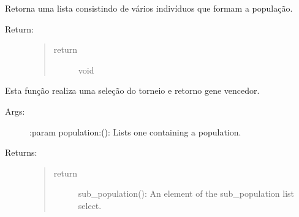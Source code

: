 \documentclass[letterpaper,10pt,english]{sphinxmanual}
\begin{document}
\begin{fulllineitems}
\begin{fulllineitems}
\label{\detokenize{index:ga.Genetic.populate}}
Retorna uma lista consistindo de vários indivíduos que formam a população.
\begin{description}
\item[{Return:}] \leavevmode\begin{quote}\begin{description}
\item[{return}] \leavevmode
void

\end{description}\end{quote}

\end{description}

\end{fulllineitems}


\begin{fulllineitems}
\label{\detokenize{index:ga.Genetic.random_selection}}
Esta função realiza uma seleção do torneio e retorno gene vencedor.
\begin{description}
\item[{Args:}] \leavevmode
:param population:(): Lists one containing a population.

\item[{Returns:}] \leavevmode\begin{quote}\begin{description}
\item[{return}] \leavevmode
sub\_population(): An element of the sub\_population list select.

\end{description}\end{quote}


\end{description}
\end{fulllineitems}
\end{fulllineitems}
\end{document}
